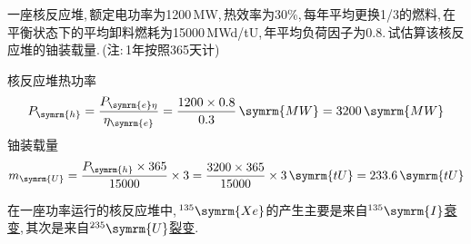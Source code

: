 \begin{exercise}
    一座核反应堆,\,额定电功率为1200\,MW,\,热效率为30\%,\,每年平均更换1/3的燃料,\,在平衡状态下的平均卸料燃耗为15000\,MWd/tU,\,年平均负荷因子为0.8.\,试估算该核反应堆的铀装载量.\,(注:\,1年按照365天计)
    \begin{solution}
        核反应堆热功率
        \begin{equation*}
            P_{\symrm{h}} = \frac{P_{\symrm{e} \eta}}{\eta_{\symrm{e}}} = \frac{1200 \times 0.8}{0.3}\,\symrm{MW} = 3200\,\symrm{MW}
        \end{equation*}
        铀装载量
        \begin{equation*}
            m_{\symrm{U}} = \frac{P_{\symrm{h}} \times 365}{15000} \times 3 = \frac{3200 \times 365}{15000} \times 3\,\symrm{tU} = 233.6\,\symrm{tU}
        \end{equation*}
    \end{solution}
\end{exercise}

\begin{exercise}
    在一座功率运行的核反应堆中,\,${}^{135}\symrm{Xe}$的产生主要是来自\underline{{\kaishu ${}^{135}\symrm{I}$衰变}},\,其次是来自\underline{{\kaishu ${}^{235}\symrm{U}$裂变}}.\,
\end{exercise}

